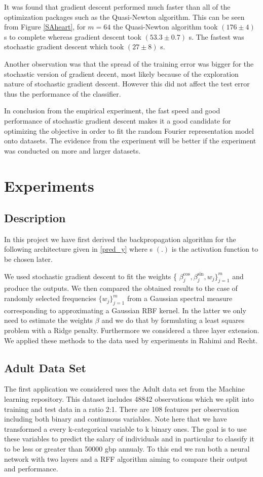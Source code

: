 \documentclass{article} %
\begin{document}
It was found that gradient descent performed much faster than all of the optimization packages such as the Quasi-Newton algorithm. This can be seen from Figure \ref{SAheart}, for $m=64$ the Quasi-Newton algorithm took $(176\pm 4)$ s to complete whereas gradient descent took $(53.3\pm 0.7)$ s. The fastest was stochastic gradient descent which took $(27\pm 8)$ s.

Another observation was that the spread of the training error was bigger for the stochastic version of gradient decent, most likely because of the exploration nature of stochastic gradient descent. However this did not affect the test error thus the performance of the classifier.

In conclusion from the empirical experiment, the fast speed and good performance of stochastic gradient descent makes it a good candidate for optimizing the objective in order to fit the random Fourier representation model onto datasets. The evidence from the experiment will be better if the experiment was conducted on more and larger datasets.




\section{Experiments}
\subsection{Description}
In this project we have first derived the backpropagation algorithm for the following architecture given in \eqref{pred_y}
where s $(.)$ is the activation function to be chosen later.

We used stochastic gradient descent to fit the weights \{ $\beta_{j}^{\cos}, \beta_{j}^{\sin}, w_{j} \}_{j=1}^{m}$ and produce the outputs. We then compared the obtained results to the case of randomly selected frequencies  $ \{w_{j}\}_{j=1}^{m}$ from a Gaussian spectral measure corresponding to approximating a Gaussian RBF kernel. In the latter we only need to estimate the weights $\beta$ and we do that by formulating a least squares problem with a Ridge penalty. Furthermore we considered a three layer extension. We applied these methods to the data used by experiments in Rahimi and Recht. \cite{Rahimi}

\subsection{Adult Data Set}
The first application we considered uses the Adult data set from the Machine learning repository. This dataset includes 48842 observations which we split into training and test data in a ratio 2:1. There are 108 features per observation including both binary and continuous variables. Note here that we have transformed a every k-categorical variable to k binary ones.  The goal is to use these variables to predict the salary of individuals and in particular to classify it to be less or greater than 50000 gbp annualy. To this end we ran both a neural network with two layers and a RFF algorithm aiming to compare their output and performance. 
\end{document}
